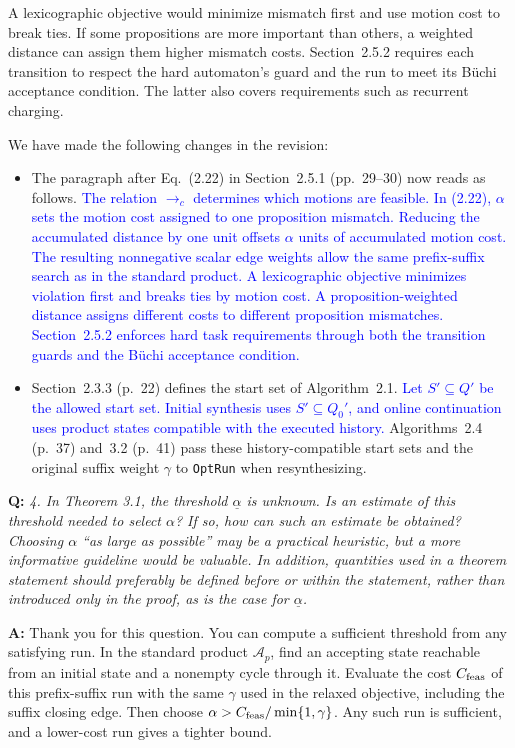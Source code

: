 \documentclass[11pt]{article}
\newcommand{\change}[1]{\textcolor{blue}{#1}}
\begin{document}
A lexicographic objective would minimize mismatch first and use motion cost
to break ties. If some propositions are more important than others, a weighted
distance can assign them higher mismatch costs. Section~2.5.2 requires
each transition to respect the hard automaton's guard and the run to meet
its B\"uchi acceptance condition. The latter also covers requirements such
as recurrent charging.

We have made the following changes in the revision:
\begin{itemize}
\item The paragraph after Eq.~(2.22) in Section~2.5.1 (pp.~29--30) now reads as follows.
\change{The relation $\longrightarrow_c$ determines which motions are feasible.
In (2.22), $\alpha$ sets the motion cost assigned to one
proposition mismatch. Reducing the accumulated distance by one unit offsets
$\alpha$ units of accumulated motion cost. The resulting nonnegative scalar
edge weights allow the same prefix-suffix search as in the standard product.
A lexicographic objective minimizes violation first and breaks ties by motion
cost. A proposition-weighted distance assigns different costs to different
proposition mismatches. Section~2.5.2 enforces hard task
requirements through both the transition guards and the B\"uchi acceptance
condition.}

\item Section~2.3.3 (p.~22) defines the start set of Algorithm~2.1.
\change{Let $S' \subseteq Q'$ be the allowed start set. Initial synthesis uses
$S' \subseteq Q_0'$, and online continuation uses product states compatible
with the executed history.}
Algorithms~2.4 (p.~37) and~3.2 (p.~41) pass these history-compatible start sets
and the original suffix weight $\gamma$ to \texttt{OptRun} when resynthesizing.
\end{itemize}

\begin{shaded*}
\noindent\textbf{Q:} \emph{4. In Theorem 3.1, the threshold
$\underline{\alpha}$ is unknown. Is an estimate of this threshold needed to select
$\alpha$? If so, how can such an estimate be obtained? Choosing $\alpha$ ``as large as
possible'' may be a practical heuristic, but a more informative guideline would be
valuable. In addition, quantities used in a theorem statement should preferably be defined
before or within the statement, rather than introduced only in the proof, as is the case
for $\underline{\alpha}$.}
\end{shaded*}
\noindent\textbf{A:} Thank you for this question. You can compute a sufficient threshold
from any satisfying
run. In the standard product $\mathcal{A}_p$, find an accepting state reachable
from an initial state and a nonempty cycle through it. Evaluate the cost
$C_{\textup{feas}}$ of this prefix-suffix run with the same $\gamma$ used in the
relaxed objective, including the suffix closing edge. Then choose
$\alpha>C_{\textup{feas}}/\min\{1,\gamma\}$. Any such run is sufficient, and a
lower-cost run gives a tighter bound.
\end{document}
